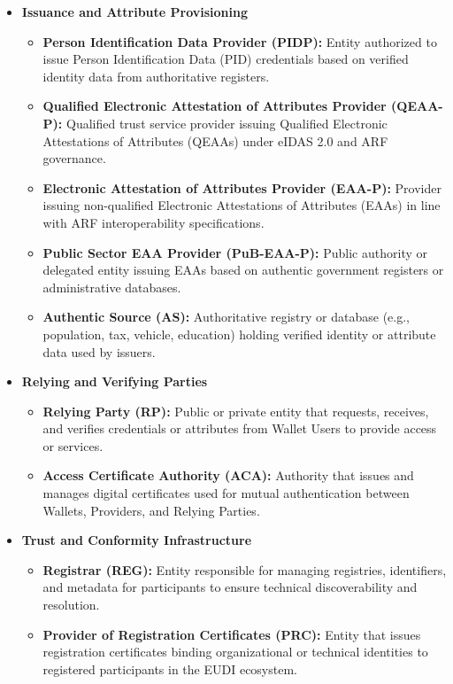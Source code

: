 \documentclass[sigconf,balance,nonacm,authordraft]{acmart}
\begin{document}
\begin{itemize}
  \item \textbf{Issuance and Attribute Provisioning}
    \begin{itemize}
      \item \textbf{Person Identification Data Provider (PIDP):}
      Entity authorized to issue Person Identification Data (PID) credentials based on verified identity data from authoritative registers.
      \item \textbf{Qualified Electronic Attestation of Attributes Provider (QEAA-P):}
      Qualified trust service provider issuing Qualified Electronic Attestations of Attributes (QEAAs) under eIDAS 2.0 and ARF governance.
      \item \textbf{Electronic Attestation of Attributes Provider (EAA-P):}
      Provider issuing non-qualified Electronic Attestations of Attributes (EAAs) in line with ARF interoperability specifications.
      \item \textbf{Public Sector EAA Provider (PuB-EAA-P):}
      Public authority or delegated entity issuing EAAs based on authentic government registers or administrative databases.
      \item \textbf{Authentic Source (AS):}
      Authoritative registry or database (e.g., population, tax, vehicle, education) holding verified identity or attribute data used by issuers.
    \end{itemize}

  \item \textbf{Relying and Verifying Parties}
    \begin{itemize}
      \item \textbf{Relying Party (RP):}
      Public or private entity that requests, receives, and verifies credentials or attributes from Wallet Users to provide access or services.
      \item \textbf{Access Certificate Authority (ACA):}
      Authority that issues and manages digital certificates used for mutual authentication between Wallets, Providers, and Relying Parties.
    \end{itemize}

  \item \textbf{Trust and Conformity Infrastructure}
    \begin{itemize}
      \item \textbf{Registrar (REG):}
      Entity responsible for managing registries, identifiers, and metadata for participants to ensure technical discoverability and resolution.
      \item \textbf{Provider of Registration Certificates (PRC):}
      Entity that issues registration certificates binding organizational or technical identities to registered participants in the EUDI ecosystem.
    \end{itemize}


\end{itemize}
\end{document}
